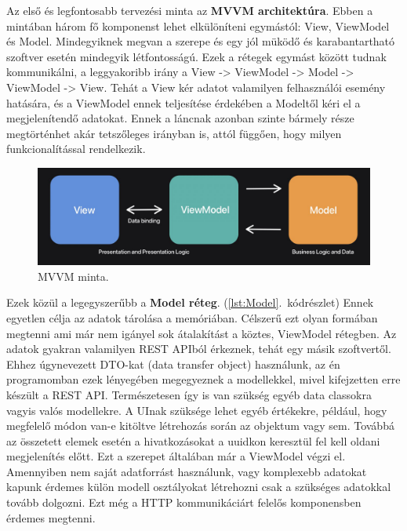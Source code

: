 Az első és legfontosabb tervezési minta az \textbf{MVVM architektúra}.
Ebben a mintában három fő komponenst lehet elkülöníteni egymástól: View, ViewModel és Model.
Mindegyiknek megvan a szerepe és egy jól müködő és karabantartható szoftver esetén mindegyik létfontosságú.
Ezek a rétegek egymást között tudnak kommunikálni, a leggyakoribb irány a View -> ViewModel -> Model -> ViewModel -> View.
Tehát a View kér adatot valamilyen felhasználói esemény hatására, és a ViewModel ennek teljesítése érdekében a Modeltől kéri el a megjelenítendő adatokat.
Ennek a láncnak azonban szinte bármely része megtörténhet akár tetszőleges irányban is, attól függően, hogy milyen funkcionalítással rendelkezik.

\begin{figure}[!ht]
    \centering
    \includegraphics[width=150mm, keepaspectratio]{figures/MVVM-architectural-pattern.png}
    \caption{MVVM minta. \cite{MVVMArchitecture}}
    \label{fig:MVVMArchitecture}
\end{figure}

Ezek közül a legegyszerűbb a \textbf{Model réteg}. (\ref{lst:Model}.~kódrészlet)
Ennek egyetlen célja az adatok tárolása a memóriában. 
Célszerű ezt olyan formában megtenni ami már nem igányel sok átalakítást a köztes, ViewModel rétegben.
Az adatok gyakran valamilyen REST APIból érkeznek, tehát egy másik szoftvertől.
Ehhez úgynevezett DTO-kat (data transfer object) használunk, az én programomban ezek lényegében megegyeznek a modellekkel, mivel kifejzetten erre készült a REST API.
Természetesen így is van szükség egyéb data classokra vagyis valós modellekre. A UInak szüksége lehet egyéb értékekre, például, hogy megfelelő módon van-e kitöltve létrehozás során az objektum vagy sem. Továbbá az összetett elemek esetén a hivatkozásokat a uuidkon keresztül fel kell oldani megjelenítés előtt. Ezt a szerepet általában már a ViewModel végzi el.
Amennyiben nem saját adatforrást használunk, vagy komplexebb adatokat kapunk érdemes külön modell osztályokat létrehozni csak a szükséges adatokkal tovább dolgozni. Ezt még a HTTP kommunikáciárt felelős komponensben érdemes megtenni.

